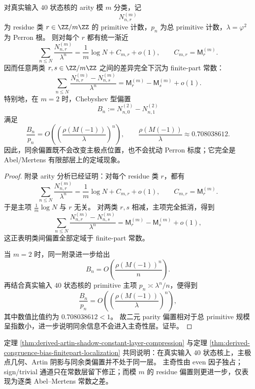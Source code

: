 \begin{theorem}[同余偏置的常数层定域化]\label{thm:derived-congruence-bias-finitepart-localization}
对真实输入 \(40\) 状态核的 arity 模 \(m\) 分类，记
\[
N_{n,r}^{(m)}
\]
为 residue 类 \(r\in \ZZ/m\ZZ\) 的 primitive 计数，\(p_n\) 为总 primitive 计数，\(\lambda=\varphi^2\) 为 Perron 根。
则对每个 \(r\) 都有统一渐近
\[
\sum_{n\le N}\frac{N_{n,r}^{(m)}}{\lambda^n}
=
\frac{1}{m}\log N + C_{m,r}+o(1),
\qquad
C_{m,r}=\mathsf{M}_r^{(m)}.
\]
因而任意两类 \(r,s\in\ZZ/m\ZZ\) 之间的差异完全下沉为 finite-part 常数：
\[
\sum_{n\le N}\frac{N_{n,r}^{(m)}-N_{n,s}^{(m)}}{\lambda^n}
=
\mathsf{M}_r^{(m)}-\mathsf{M}_s^{(m)}+o(1).
\]
特别地，在 \(m=2\) 时，Chebyshev 型偏置
\[
B_n:=N_{n,0}^{(2)}-N_{n,1}^{(2)}
\]
满足
\[
\frac{B_n}{p_n}
=
O\!\left(\left(\frac{\rho(M(-1))}{\lambda}\right)^n\right),
\qquad
\frac{\rho(M(-1))}{\lambda}\approx 0.708038612.
\]
因此，同余偏置既不会改变主极点位置，也不会扰动 Perron 标度；它完全是 Abel/Mertens 有限部层上的定域现象。
\end{theorem}

\begin{proof}
附录 arity 分析已经证明：对每个 residue 类 \(r\)，都有
\[
\sum_{n\le N}\frac{N_{n,r}^{(m)}}{\lambda^n}
=
\frac{1}{m}\log N + C_{m,r}+o(1),
\qquad
C_{m,r}=\mathsf{M}_r^{(m)}.
\]
于是主项 \(\frac{1}{m}\log N\) 与 \(r\) 无关。
对两类 \(r,s\) 相减，主项完全抵消，得到
\[
\sum_{n\le N}\frac{N_{n,r}^{(m)}-N_{n,s}^{(m)}}{\lambda^n}
=
\mathsf{M}_r^{(m)}-\mathsf{M}_s^{(m)}+o(1),
\]
这正表明类间偏置全部定域于 finite-part 常数。

当 \(m=2\) 时，同一附录进一步给出
\[
B_n=O\!\left(\frac{\rho(M(-1))^n}{n}\right).
\]
再结合真实输入 \(40\) 状态核的 primitive 主项
\(
p_n\asymp \lambda^n/n
\)，便得到
\[
\frac{B_n}{p_n}
=
O\!\left(\left(\frac{\rho(M(-1))}{\lambda}\right)^n\right),
\]
其中数值比值约为 \(0.708038612<1\)。
故二元 parity 偏置相对于总 primitive 规模呈指数小，进一步说明同余信息不会进入主奇性层。证毕。
\end{proof}

\begin{remark}[主奇性与类偏置的严格分层]\label{rem:derived-artin-even-finitepart-congruence-splitting}
定理 \ref{thm:derived-artin-shadow-constant-layer-compression}
与定理 \ref{thm:derived-congruence-bias-finitepart-localization}
共同说明：在真实输入 \(40\) 状态核上，主极点几何、Artin 阴影与同余类偏置并不处于同一层。
主奇性由 even 因子独占；sign/trivial 通道只在常数层留下修正；而模 \(m\) 的 residue 偏置则更进一步，仅表现为逐类 Abel--Mertens 常数之差。
\end{remark}

\endinput
